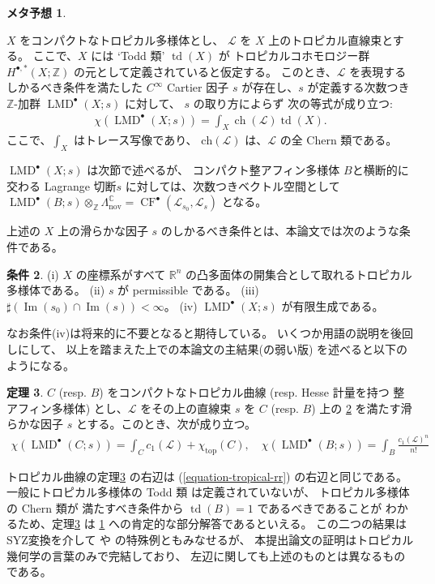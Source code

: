 \documentclass[uplatex,dvipdfmx,12pt]{jsarticle}
\numberwithin{equation}{section}
\theoremstyle{definition}
\newtheorem{theorem}{定理}[section]
\newtheorem{condition}[theorem]{条件}
\newtheorem{expectation}[theorem]{メタ予想}
\newcommand{\opn}[1]{\operatorname{#1}}
\begin{document}
\begin{expectation} \label{conjecture-mirror-tropical-rr}

$X$ をコンパクトなトロピカル多様体とし、
$\mathcal{L}$ を $X$ 上のトロピカル直線束とする。
ここで、$X$ には `Todd 類' $\opn{td}(X)$ が
トロピカルコホモロジー群 $H^{\bullet,*}(X;\mathbb{Z})$
の元として定義されていると仮定する。
このとき、$\mathcal{L}$ を表現するしかるべき条件を満たした
$C^{\infty}$ Cartier 因子 $s$ が存在し、$s$ が定義する次数つき
$\mathbb{Z}$-加群 $\opn{LMD}^{\bullet}(X;s)$ に対して、
$s$ の取り方によらず
次の等式が成り立つ:
\begin{align}
\chi(\opn{LMD}^{\bullet}(X;s))=\int_{X}\opn{ch}(\mathcal{L})\opn{td}(X).
\end{align}
ここで、$\int_X$ はトレース写像であり、
$\mathrm{ch}(\mathcal{L})$ は、$\mathcal{L}$ の全 Chern 類である。
\end{expectation}
$\opn{LMD}^{\bullet}(X;s)$ は次節で述べるが、
コンパクト整アフィン多様体 $B$と横断的に交わる Lagrange 切断$s$
に対しては、次数つきベクトル空間として
$\opn{LMD}^{\bullet}(B;s)\otimes_{\mathbb{Z}}
\Lambda^{\mathbb{C}}_{\mathrm{nov}}=
\opn{CF}^{\bullet}(\mathscr{L}_{s_0},
\mathscr{L}_s)$ となる。

上述の $X$ 上の滑らかな因子 $s$ のしかるべき条件とは、本論文では次のような条件である。

\begin{condition} \label{condition-good}
(i) $X$ の座標系がすべて $\mathbb{R}^{n}$ 
の凸多面体の開集合として取れるトロピカル多様体である。
(ii) $s$ が permissible である。
(iii) $\sharp (\opn{Im}(s_0)\cap \opn{Im}(s))<\infty$。
(iv) $\opn{LMD}^{\bullet}(X;s)$ が有限生成である。
\end{condition}
なお条件(iv)は将来的に不要となると期待している。
いくつか用語の説明を後回しにして、
以上を踏まえた上での本論文の主結果(の弱い版)
を述べると以下のようになる。

\begin{theorem} \label{theorem-main}
$C$ (resp. $B$) をコンパクトなトロピカル曲線 (resp. Hesse 計量を持つ
整アフィン多様体) とし、$\mathcal{L}$ をその上の直線束
$s$ を $C$ (resp. $B$) 上の
\cref{condition-good} を満たす滑らかな因子 $s$ 
とする。このとき、次が成り立つ。
\begin{align}
\chi(\opn{LMD}^{\bullet}(C;s))=\int_C c_1(\mathcal{L})+
\chi_{\opn{top}}(C), \quad
\chi(\opn{LMD}^{\bullet}(B;s))=\int_B \frac{c_1(\mathcal{L})^n}{n!}
\end{align}
\end{theorem}
トロピカル曲線の定理\ref{theorem-main} の右辺は
(\ref{equation-tropical-rr}) の右辺と同じである。
一般にトロピカル多様体の Todd 類 は定義されていないが、
トロピカル多様体の Chern 類が
満たすべき条件から $\opn{td}(B)=1$ であるべきであることが
わかるため、定理\ref{theorem-main} は
\cref{conjecture-mirror-tropical-rr}
への肯定的な部分解答であるといえる。
この二つの結果はSYZ変換を介して \cite{MR4301560} や 
\cite{auroux2022lagrangian} の特殊例ともみなせるが、
本提出論文の証明はトロピカル幾何学の言葉のみで完結しており、
左辺に関しても上述のものとは異なるものである。
\end{document}
